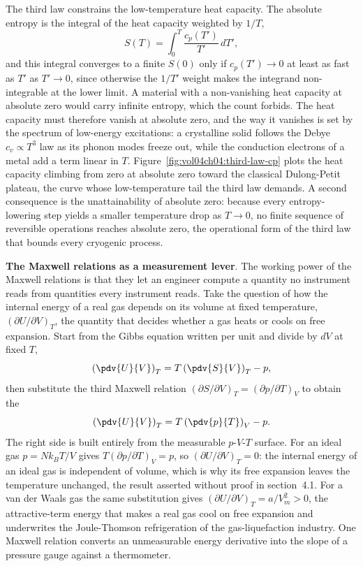 The third law constrains the low-temperature heat capacity. The absolute entropy
is the integral of the heat capacity weighted by $1/T$,
\[
S(T) = \int_0^T \frac{c_p(T')}{T'}\,dT',
\]
and this integral converges to a finite $S(0)$ only if $c_p(T') \to 0$ at least
as fast as $T'$ as $T' \to 0$, since otherwise the $1/T'$ weight makes the
integrand non-integrable at the lower limit. A material with a non-vanishing heat
capacity at absolute zero would carry infinite entropy, which the count forbids.
The heat capacity must therefore vanish at absolute zero, and the way it vanishes
is set by the spectrum of low-energy excitations: a crystalline solid follows the
Debye $c_v \propto T^3$ law as its phonon modes freeze out, while the conduction
electrons of a metal add a term linear in $T$.
Figure~\ref{fig:vol04ch04:third-law-cp} plots the heat capacity climbing from
zero at absolute zero toward the classical Dulong-Petit plateau, the curve whose
low-temperature tail the third law demands. A second consequence is the
unattainability of absolute zero: because every entropy-lowering step yields a
smaller temperature drop as $T \to 0$, no finite sequence of reversible
operations reaches absolute zero, the operational form of the third law that
bounds every cryogenic process.



\begin{mastery}
\textbf{The Maxwell relations as a measurement lever}. The working power of the
Maxwell relations is that they let an engineer compute a quantity no instrument
reads from quantities every instrument reads. Take the question of how the
internal energy of a real gas depends on its volume at fixed temperature,
$(\partial U/\partial V)_T$, the quantity that decides whether a gas heats or
cools on free expansion. Start from the Gibbs equation written per unit and
divide by $dV$ at fixed $T$,
\[
\left(\pdv{U}{V}\right)_T = T\left(\pdv{S}{V}\right)_T - p,
\]
then substitute the third Maxwell relation $(\partial S/\partial V)_T = (\partial
p/\partial T)_V$ to obtain the 
\[
\left(\pdv{U}{V}\right)_T = T\left(\pdv{p}{T}\right)_V - p.
\]
The right side is built entirely from the measurable $p$-$V$-$T$ surface. For an
ideal gas $p = Nk_B T/V$ gives $T(\partial p/\partial T)_V = p$, so $(\partial
U/\partial V)_T = 0$: the internal energy of an ideal gas is independent of
volume, which is why its free expansion leaves the temperature unchanged, the
result asserted without proof in section~4.1. For a van der Waals gas the same
substitution gives $(\partial U/\partial V)_T = a/V_m^2 > 0$, the attractive-term
energy that makes a real gas cool on free expansion and underwrites the
Joule-Thomson refrigeration of the gas-liquefaction industry. One Maxwell
relation converts an unmeasurable energy derivative into the slope of a pressure
gauge against a thermometer.
\end{mastery}

